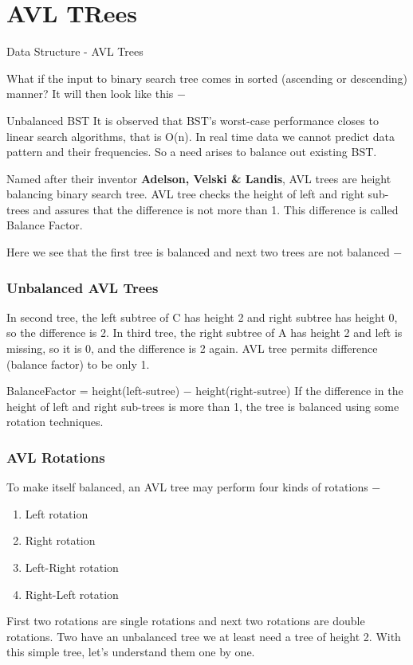 \documentclass{beamer}
\begin{document}
\section{AVL TRees}
\begin{frame}


Data Structure - AVL Trees
\end{frame}
\begin{frame}
What if the input to binary search tree comes in sorted (ascending or descending) manner? It will then look like this −

Unbalanced BST
It is observed that BST's worst-case performance closes to linear search algorithms, that is Ο(n). In real time data we cannot predict data pattern and their frequencies. So a need arises to balance out existing BST.
\end{frame}
\begin{frame}
Named after their inventor \textbf{Adelson, Velski \& Landis}, AVL trees are height balancing binary search tree. AVL tree checks the height of left and right sub-trees and assures that the difference is not more than 1. This difference is called Balance Factor.

Here we see that the first tree is balanced and next two trees are not balanced −

\end{frame}
\begin{frame}
\frametitle{Unbalanced AVL Trees}
\large
In second tree, the left subtree of C has height 2 and right subtree has height 0, so the difference is 2. In third tree, the right subtree of A has height 2 and left is missing, so it is 0, and the difference is 2 again. AVL tree permits difference (balance factor) to be only 1.

BalanceFactor = height(left-sutree) − height(right-sutree)
If the difference in the height of left and right sub-trees is more than 1, the tree is balanced using some rotation techniques.
\end{frame}
\begin{frame}
\frametitle{AVL Rotations}
\large

To make itself balanced, an AVL tree may perform four kinds of rotations −
\begin{enumerate}
	\item
Left rotation
\item Right rotation
\item Left-Right rotation
\item Right-Left rotation
\end{enumerate}
First two rotations are single rotations and next two rotations are double rotations. Two have an unbalanced tree we at least need a tree of height 2. With this simple tree, let's understand them one by one.
\end{frame}
\end{document}
